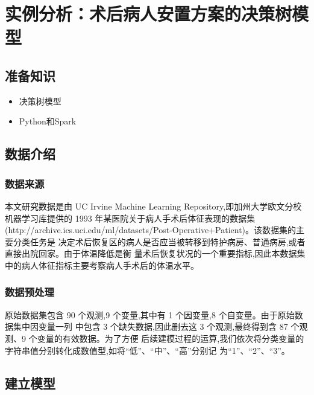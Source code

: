 \section{实例分析：术后病人安置方案的决策树模型}\label{ux5b9eux4f8bux5206ux6790ux672fux540eux75c5ux4ebaux5b89ux7f6eux65b9ux6848ux7684ux51b3ux7b56ux6811ux6a21ux578b}

\subsection{准备知识}\label{ux51c6ux5907ux77e5ux8bc6}

\begin{itemize}
\itemsep1pt\parskip0pt
\item
  决策树模型
\item
  Python和Spark
\end{itemize}

\subsection{数据介绍}\label{ux6570ux636eux4ecbux7ecd}

\subsubsection{数据来源}\label{ux6570ux636eux6765ux6e90}

本文研究数据是由 UC Irvine Machine Learning
Repository,即加州大学欧文分校机器学习库提供的 1993
年某医院关于病人手术后体征表现的数据集
(http://archive.ics.uci.edu/ml/datasets/Post-Operative+Patient)。该数据集的主要分类任务是
决定术后恢复区的病人是否应当被转移到特护病房、普通病房,或者直接出院回家。由于体温降低是衡
量术后恢复状况的一个重要指标,因此本数据集中的病人体征指标主要考察病人手术后的体温水平。

\subsubsection{数据预处理}\label{ux6570ux636eux9884ux5904ux7406}

原始数据集包含 90 个观测,9 个变量,其中有 1 个因变量,8
个自变量。由于原始数据集中因变量一列 中包含 3 个缺失数据,因此删去这 3
个观测,最终得到含 87 个观测、9 个变量的有效数据。为了方便
后续建模过程的运算,我们依次将分类变量的字符串值分别转化成数值型,如将``低''、``中''、``高''分别记
为``1''、``2''、``3''。

\subsection{建立模型}\label{ux5efaux7acbux6a21ux578b}

